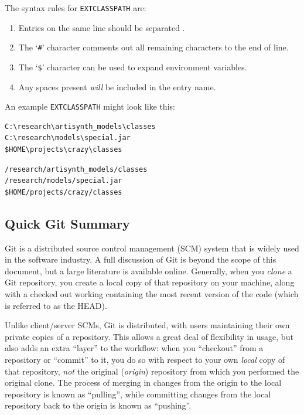 The syntax rules for {\tt EXTCLASSPATH} are:

\begin{enumerate}

\item Entries on the same line should be separated
\separatorDesc{}.

\item The `{\tt \#}' character comments out all remaining characters
to the end of line.

\item The `{\tt \$}' character can be used to expand environment variables.

\item Any spaces present {\it will} be included in the entry name.

\end{enumerate}

An example {\tt EXTCLASSPATH} might look like this:

\ifWindows
\begin{verbatim}
C:\research\artisynth_models\classes
C:\research\models\special.jar
$HOME\projects\crazy\classes
\end{verbatim}
\else %
\begin{verbatim}
/research/artisynth_models/classes
/research/models/special.jar
$HOME/projects/crazy/classes
\end{verbatim}
\fi %

\subsection{Quick Git Summary}
\label{GitSummary}

Git is a distributed source control management (SCM) system that is
widely used in the software industry.  A full discussion of Git is
beyond the scope of this document, but a large literature is available
online. Generally, when you {\it clone} a Git repository, you create a
local copy of that repository on your machine, along with a checked
out working \directory{} containing the most recent version of the code
(which is referred to as the HEAD).

Unlike client/server SCMs, Git is distributed, with users maintaining
their own private copies of a repository. This allows a great deal of
flexibility in usage, but also adds an extra ``layer'' to the
workflow: when you ``checkout'' from a repository or ``commit'' to it,
you do so with respect to your own {\it local} copy of that
repository, {\it not} the original ({\it origin}) repository from
which you performed the original clone. The process of merging in
changes from the origin to the local repository is known as
``pulling'', while committing changes from the local repository back
to the origin is known as ``pushing''.

